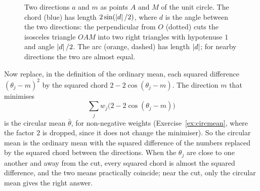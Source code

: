 \begin{figure}[ht]
\centering
{}
\caption{Two directions $a$ and $m$ as points $A$ and $M$ of the unit
circle. The chord (blue) has length $2\sin(\left\lvert d\right\rvert/2)$, where $d$ is the
angle between the two directions: the perpendicular from $O$ (dotted) cuts
the isosceles triangle $OAM$ into two right triangles with hypotenuse $1$
and angle $\left\lvert d\right\rvert/2$. The arc (orange, dashed) has length $\left\lvert d\right\rvert$; for
nearby directions the two are almost equal.}
\label{fig:chord}
\end{figure}

Now replace, in the definition of the ordinary mean, each squared
difference $(\theta_j-m)^2$ by the squared chord $2-2\cos(\theta_j-m)$.
The direction $m$ that minimises
\[
  \sum_jw_j\bigl(2-2\cos(\theta_j-m)\bigr)
\]
is the circular mean $\bar\theta$, for non-negative weights
(Exercise~\ref{ex:circmean}, where the factor $2$ is dropped, since it
does not change the minimiser). So the circular mean is the ordinary mean
with the squared difference of the numbers replaced by the squared chord
between the directions. When the $\theta_j$ are close to one another and
away from the cut, every squared chord is almost the squared difference,
and the two means practically coincide; near the cut, only the circular
mean gives the right answer.

